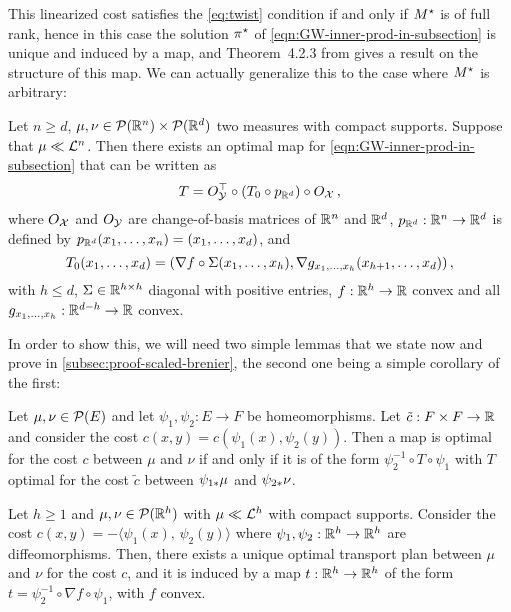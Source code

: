         This linearized cost satisfies the \cref{eq:twist} condition if and only if $M^\star$ is of full rank, hence in this case the solution $\pi^\star$ of \cref{eqn:GW-inner-prod-in-subsection} is unique and induced by a map, and Theorem~4.2.3 from \cite{vayer2020contribution} gives a result on the structure of this map. We can actually generalize this to the case where $M^\star$ is arbitrary:
        \begin{theorem}
            \label{theorem:inner-main}
            Let $n\geq d$, $\mu, \nu\in \mathcal{P}(\mathbb{R}^n)\times\mathcal{P}(\mathbb{R}^d)$ two measures with compact supports. Suppose that $\mu\ll\mathcal{L}^n$. Then there exists an optimal map for \cref{eqn:GW-inner-prod-in-subsection} that can be written as
            \begin{equation}
                T=O_{\mathcal{Y}}^\top \circ (T_0\circ p_{\mathbb{R}^d})\circ O_{\mathcal{X}}\,,
                \label{eq:T0-form-1}
            \end{equation}
            where $O_{\mathcal{X}}$ and $O_{\mathcal{Y}}$ are change-of-basis matrices of $\mathbb{R}^n$ and $\mathbb{R}^d$, $p_{\mathbb{R}^d}: \mathbb{R}^n \to \mathbb{R}^d$ is defined by $p_{\mathbb{R}^d}(x_1,\dots,x_n)=(x_1,\dots,x_d)$, and
            \begin{equation}
                T_0(x_1,\dots,x_d)=(\nabla f\circ\Sigma(x_1,\dots,x_h), \nabla g_{x_1,\dots,x_h}(x_{h+1},\dots,x_d))\,,
                \label{eq:T0-form-2}
            \end{equation}
            with $h\leq d$, $\Sigma\in \mathbb{R}^{h\times h}$ diagonal with positive entries, $f: \mathbb{R}^h \to \mathbb{R}$ convex and all $g_{x_1,\dots,x_h}: \mathbb{R}^{d-h} \to \mathbb{R}$ convex.
        \end{theorem}
        In order to show this, we will need two simple lemmas that we state now and prove in \cref{subsec:proof-scaled-brenier}, the second one being a simple corollary of the first:
                \begin{lemma}
                \label{lemma:reparam}
                Let $\mu,\nu\in \mathcal{P}(E)$ and let $\psi_1,\psi_2:E\to F$ be homeomorphisms. Let $\tilde c:F\times F\to\mathbb{R}$ and consider the cost $c(x,y)= c( \psi_1(x),\psi_2(y))$. Then a map is optimal for the cost $c$ between $\mu$ and $\nu$ if and only if it is of the form $\psi_2^{-1}\circ T\circ\psi_1$ with $T$ optimal for the cost $\tilde c$ between $\psi_{1*}\mu$ and $\psi_{2*}\nu$.
            \end{lemma}
            \begin{lemma}
                \label{lemma:scaled-Brenier}
                Let $h\geq 1$ and $\mu,\nu\in \mathcal{P}(\mathbb{R}^h)$ with $\mu\ll\mathcal{L}^h$ with compact supports. Consider the cost $c(x, y)= -\langle \psi_1(x),\,\psi_2(y)\rangle$ where $\psi_1,\psi_2:\mathbb{R}^h\to \mathbb{R}^h$ are diffeomorphisms.
                Then, there exists a unique optimal transport plan between $\mu$ and $\nu$ for the cost $c$, and it is induced by a map $t:\mathbb{R}^h\to \mathbb{R}^h$ of the form $t=\psi_2^{-1}\circ\nabla f\circ\psi_1$, with $f$ convex.
            \end{lemma}

